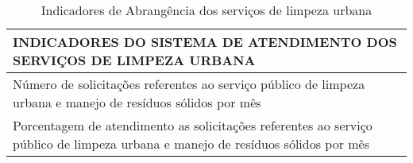 \begin{table}[h!]
  \centering
  \caption{Indicadores de Abrangência dos serviços de limpeza urbana }
    \begin{tabular}{|p{22.785em}|}
    \toprule
    \rowcolor[rgb]{ .867,  .922,  .969} INDICADORES DO SISTEMA DE ATENDIMENTO DOS SERVIÇOS DE LIMPEZA URBANA \\
    \midrule
    Número de solicitações referentes ao serviço público de limpeza urbana e manejo de resíduos sólidos por mês \\
    \midrule
    Porcentagem de atendimento as solicitações referentes ao serviço público de limpeza urbana e manejo de resíduos sólidos por mês \\
    \bottomrule
    \end{tabular}%
  \label{tab:ind_abrangencia_slu}%
\end{table}%
